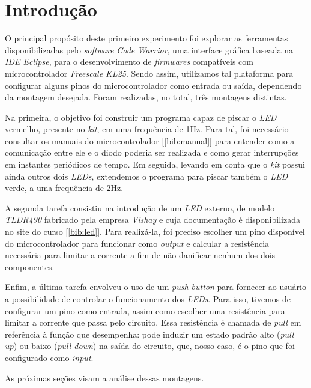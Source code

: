 \section {Introdução}

O principal propósito deste primeiro experimento foi explorar as ferramentas
disponibilizadas pelo \textit{software} \textit{Code Warrior}, uma interface
gráfica baseada na \textit{IDE Eclipse}, para o desenvolvimento de
\textit{firmwares} compatíveis com microcontrolador \textit{Freescale KL25}.
Sendo assim, utilizamos tal plataforma para configurar alguns pinos do
microcontrolador como entrada ou saída, dependendo da montagem desejada. Foram
realizadas, no total, três montagens distintas.

\vspace{12pt}

Na primeira, o objetivo foi construir um programa capaz de piscar o \textit{LED}
vermelho, presente no \textit{kit}, em uma frequência de 1Hz. Para tal, foi
necessário consultar os manuais do microcontrolador [\ref{bib:manual}] para
entender como a comunicação entre ele e o diodo poderia ser realizada e como gerar interrupções
em instantes periódicos de tempo. Em seguida, levando em conta que o
\textit{kit} possui ainda outros dois \textit{LEDs}, extendemos o programa para piscar
também o \textit{LED} verde, a uma frequência de 2Hz.

\vspace{12pt}

A segunda tarefa consistiu na introdução de um \textit{LED} externo, de
modelo \textit{TLDR490} fabricado pela empresa \textit{Vishay} e cuja
documentação é disponibilizada no site do curso [\ref{bib:led}]. Para
realizá-la, foi preciso escolher um pino disponível do microcontrolador para funcionar como
\textit{output} e calcular a resistência necessária para limitar a corrente a
fim de não danificar nenhum dos dois componentes.

\vspace{12pt}

Enfim, a última tarefa envolveu o uso de um \textit{push-button} para fornecer
ao usuário a possibilidade de controlar o funcionamento dos \textit{LEDs}. Para
isso, tivemos de configurar um pino como entrada, assim como escolher
uma resistência para limitar a corrente que passa pelo circuito. Essa
resistência é chamada de \textit{pull} em referência à função que desempenha:
pode induzir um estado padrão alto (\textit{pull up}) ou baixo (\textit{pull
down}) na saída do circuito, que, nosso caso, é o pino que foi configurado como
\textit{input}.

\vspace{12pt}

As próximas seções visam a análise dessas montagens.